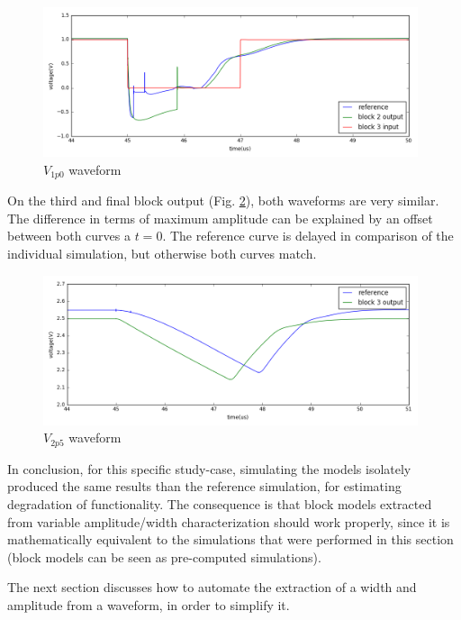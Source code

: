 \begin{figure}[!h]
  \centering
  \includegraphics[width=0.98\textwidth]{src/4/figures/simulation_comparison_block2.png}
  \caption{$V_{1p0}$ waveform}
  \label{fig:sim-compare-block2}
\end{figure}

On the third and final block output (Fig. \ref{fig:sim-compare-block3}), both waveforms are very similar.
The difference in terms of maximum amplitude can be explained by an offset between both curves a $t=0$.
The reference curve is delayed in comparison of the individual simulation, but otherwise both curves match.

\begin{figure}[!h]
  \centering
  \includegraphics[width=0.98\textwidth]{src/4/figures/simulation_comparison_block3.png}
  \caption{$V_{2p5}$ waveform}
  \label{fig:sim-compare-block3}
\end{figure}

In conclusion, for this specific study-case, simulating the models isolately produced the same results than the reference simulation, for estimating degradation of functionality.
The consequence is that block models extracted from variable amplitude/width characterization should work properly, since it is mathematically equivalent to the simulations that were performed in this section (block models can be seen as pre-computed simulations).

The next section discusses how to automate the extraction of a width and amplitude from a waveform, in order to simplify it.

